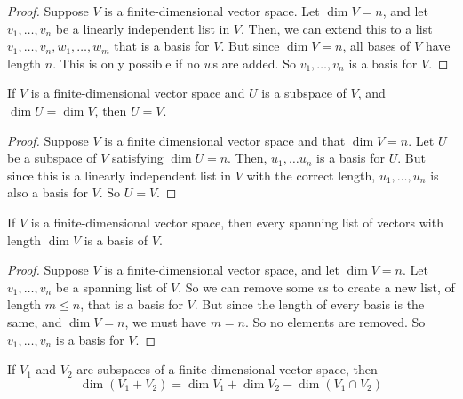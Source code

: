 \begin{proof}
    Suppose $V$ is a finite-dimensional vector space. Let $\dim V = n$, and let $v_1, \dots, v_n$ be a linearly independent list in $V$. Then, we can extend this to a list $v_1, \dots, v_n, w_1, \dots, w_m$ that is a basis for $V$. But since $\dim V = n$, all bases of $V$ have length $n$. This is only possible if no $w$s are added. So $v_1, \dots, v_n$ is a basis for $V$. 
\end{proof}
\begin{theorem}
    If $V$ is a finite-dimensional vector space and $U$ is a subspace of $V$, and $\dim U =\dim V$, then $U=V$.
\end{theorem}
\begin{proof}
    Suppose $V$ is a finite dimensional vector space and that $\dim V = n$. Let $U$ be a subspace of $V$ satisfying $\dim U = n$. Then, $u_1, \dots u_n$ is a basis for $U$. But since this is a linearly independent list in $V$ with the correct length, $u_1, \dots, u_n$ is also a basis for $V$. So $U=V$.
\end{proof}
\begin{theorem}
    If $V$ is a finite-dimensional vector space, then every spanning list of vectors with length $\dim V$ is a basis of $V$.
\end{theorem}   
\begin{proof}
    Suppose $V$ is a finite-dimensional vector space, and let $\dim V = n$. Let $v_1, \dots, v_n$ be a spanning list of $V$. So we can remove some $v$s to create a new list, of length $m\le n$, that is a basis for $V$. But since the length of every basis is the same, and $\dim V=n$, we must have $m=n$. So no elements are removed. So $v_1, \dots, v_n$ is a basis for $V$.
\end{proof}
\begin{theorem} \label{dimension of a sum}
    If $V_1$ and $V_2$ are subspaces of a finite-dimensional vector space, then
    \[ \dim(V_1+V_2) = \dim V_1 + \dim V_2 - \dim(V_1\cap V_2)\]
\end{theorem}
